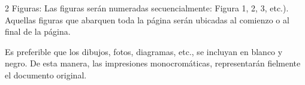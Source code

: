 \begin{multicols}{2}
Figuras: Las figuras serán numeradas secuencialmente: Figura 1, 2, 3, etc.).
Aquellas figuras que abarquen toda la página serán ubicadas al comienzo o al final de la página.


Es preferible que los dibujos, fotos, diagramas, etc., se incluyan en blanco y negro. De esta manera, las impresiones monocromáticas, representarán fielmente el documento original.

\end{multicols}

